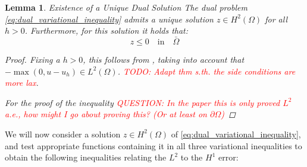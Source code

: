 \documentclass[headsepline,footsepline,footinclude=false,oneside,fontsize=11pt,paper=a4,listof=totoc,bibliography=totoc]{scrbook} %
\newtheorem{lemma}{Lemma}
\begin{document}
\begin{lemma}Existence of a Unique Dual Solution \newline 
	The dual problem \eqref{eq:dual_variational_inequality} admits a unique solution $z \in H^2(\Omega)$ for all $h > 0$. Furthermore, for this solution it holds that:
	\begin{equation} \label{eq:dual_solution_nonpositive}
		z \leq 0 \quad \text{in} \quad \bar{\Omega}
	\end{equation}
	\begin{proof}
		Fixing a $h>0$, this follows from , taking into account that $-\max(0,u-u_h) \in L^2(\Omega)$. \textcolor{red}{TODO: Adapt thm s.th. the side conditions are more lax}.
		
		For the proof of the inequality \textcolor{red}{QUESTION: In the paper this is only proved $L^2$ a.e., how might I go about proving this? (Or at least on $\partial\Omega$)}
	\end{proof}
\end{lemma}

We will now consider a solution $z \in H^2(\Omega)$ of \eqref{eq:dual_variational_inequality}, and test appropriate functions containing it in all three variational inequalities to obtain the following inequalities relating the $L^2$ to the $H^1$ error:
\end{document}
